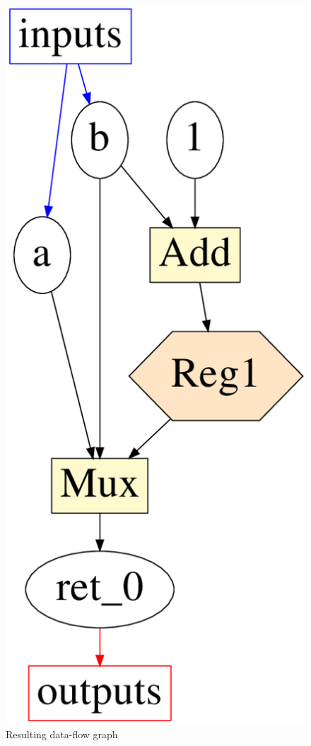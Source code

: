 \documentclass[10pt,a4paper]{article}
\begin{document}
\begin{figure}
	\center
\vspace{-22pt}
	\includegraphics[scale=.22]{Reg_A.png}
	\caption{Resulting data-flow graph}
	\label{fig:skip}
\end{figure}
\end{document}
